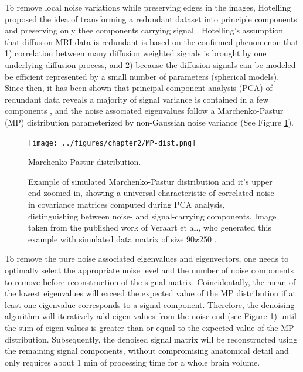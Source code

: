 To remove local noise variations while preserving edges in the images, Hotelling proposed the idea of transforming a redundant dataset into principle components and preserving only thee components carrying signal \cite{hotelling1933analysis}. Hotelling's assumption that diffusion MRI data is redundant is based on the confirmed phenomenon that 1) correlation between many diffusion weighted signals is brought by one underlying diffusion process, and 2) because the diffusion signals can be modeled be efficient represented by a small number of parameters (spherical models). Since then, it has been shown that principal component analysis (PCA) of redundant data reveals a majority of signal variance is contained in a few components \cite{deledalle2011image,manjon_mri_2015} , and the noise associated eigenvalues follow a Marchenko-Pastur (MP) distribution parameterized by non-Gaussian noise variance \cite{marchenko1967distribution} (See Figure \ref{fig:mp_dist}). 

\begin{figure}[htbp]
    \centering
    \texttt{[image: ../figures/chapter2/MP-dist.png]}
    \caption{Marchenko-Pastur distribution.}
    \caption*{Example of simulated Marchenko-Pastur distribution and it's upper end zoomed in, showing a universal characteristic of correlated noise in covariance matrices computed during PCA analysis, distinguishing between noise- and signal-carrying components. Image taken from the published work of Veraart et al., who generated this example with simulated data matrix of size $90x250$ \cite{veraart_denoising_2016}.}
    \label{fig:mp_dist}
\end{figure}

To remove the pure noise associated eigenvalues and eigenvectors, one needs to optimally select the appropriate noise level and the number of noise components to remove before reconstruction of the signal matrix. Coincidentally, the mean of the lowest eigenvalues will exceed the expected value of the MP distribution if at least one eigenvalue corresponds to a signal component. Therefore, the denoising algorithm will iteratively add eigen values from the noise end (see Figure \ref{fig:mp_dist}) until the sum of eigen values is greater than or equal to the expected value of the MP distribution. Subsequently, the denoised signal matrix will be reconstructed using the remaining signal components, without compromising anatomical detail and only requires about 1 min of processing time for a whole brain volume.

